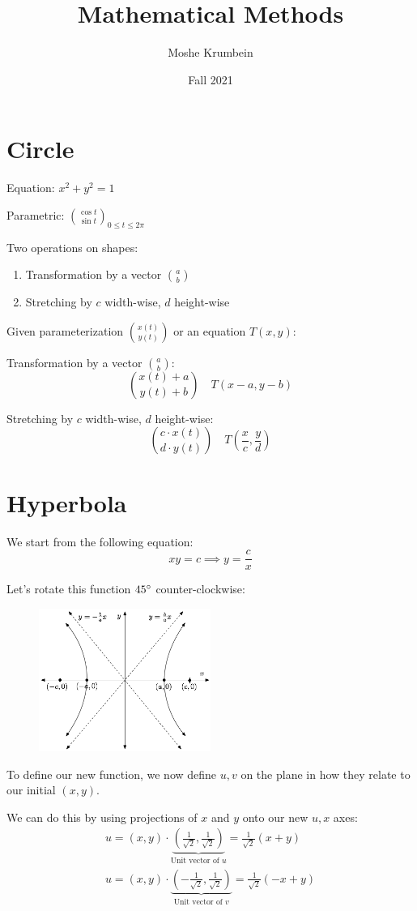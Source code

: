 \documentclass[00_complete]{subfiles}
\title{Mathematical Methods}
\author{Moshe Krumbein}
\date{Fall 2021}
\begin{document}

\section{Circle}

Equation: $x^2+y^2=1$

Parametric: $\binom{\cos t}{\sin t}_{0 \leq t \leq 2 \pi}$

Two operations on shapes:
\begin{enumerate} \tightlist
    \item Transformation by a vector $\binom{a}{b}$
    \item Stretching by $c$ width-wise, $d$ height-wise
\end{enumerate}

Given parameterization $\binom{x(t)}{y(t)}$ or an equation $T(x,y)$:

Transformation by a vector $\binom{a}{b}$:
$$\binom{x(t) + a}{y(t) + b} \quad T(x-a, y-b)$$

Stretching by $c$ width-wise, $d$ height-wise:
$$\binom{c \cdot x(t)}{d \cdot y(t)} \quad T\left(\frac{x}{c}, \frac{y}{d}\right)$$

\section{Hyperbola}
We start from the following equation:
$$xy=c \implies y=\frac{c}{x}$$

Let's rotate this function $45 \degree$ counter-clockwise:

\begin{figure}[ht]
    \centering
      \includegraphics[width=0.5\textwidth]{hyperbola}
\end{figure}

To define our new function, we now define ${u,v}$ on the plane in how they
relate to our initial $(x,y)$.

We can do this by using projections of $x$ and $y$ onto our new $u, x$ axes:
$$
\begin{gathered}
    u = (x,y) \cdot \underbrace{\left( \frac{1}{\sqrt 2}, \frac{1}{\sqrt 2}\right)}_{\text{Unit vector of $u$}} = \frac{1}{\sqrt 2}( x+y) \\
    u = (x,y) \cdot \underbrace{\left(-\frac{1}{\sqrt 2}, \frac{1}{\sqrt 2}\right)}_{\text{Unit vector of $v$}} = \frac{1}{\sqrt 2}(-x+y)
\end{gathered}
$$
\end{document}
